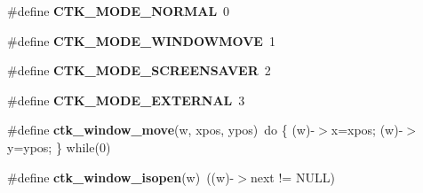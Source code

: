 \begin{DoxyCompactItemize}
\item 
\hypertarget{group__ctk_gaf19084b5b0a43593b45a2172d1390ba6}{}\#define {\bfseries C\+T\+K\+\_\+\+M\+O\+D\+E\+\_\+\+N\+O\+R\+M\+A\+L}~0\label{group__ctk_gaf19084b5b0a43593b45a2172d1390ba6}

\item 
\hypertarget{group__ctk_gaced6064f07d93129008ec8a2fcb638af}{}\#define {\bfseries C\+T\+K\+\_\+\+M\+O\+D\+E\+\_\+\+W\+I\+N\+D\+O\+W\+M\+O\+V\+E}~1\label{group__ctk_gaced6064f07d93129008ec8a2fcb638af}

\item 
\hypertarget{group__ctk_ga24ef80b235aaf2ca8cbafb6e33a7b793}{}\#define {\bfseries C\+T\+K\+\_\+\+M\+O\+D\+E\+\_\+\+S\+C\+R\+E\+E\+N\+S\+A\+V\+E\+R}~2\label{group__ctk_ga24ef80b235aaf2ca8cbafb6e33a7b793}

\item 
\hypertarget{group__ctk_gae9acd01f96a48ba232082b5156c226d7}{}\#define {\bfseries C\+T\+K\+\_\+\+M\+O\+D\+E\+\_\+\+E\+X\+T\+E\+R\+N\+A\+L}~3\label{group__ctk_gae9acd01f96a48ba232082b5156c226d7}

\item 
\hypertarget{group__ctk_ga61b968c705766384aa3aacc44cb0723a}{}\#define {\bfseries ctk\+\_\+window\+\_\+move}(w,  xpos,  ypos)~do \{ (w)-\/$>$x=xpos; (w)-\/$>$y=ypos; \} while(0)\label{group__ctk_ga61b968c705766384aa3aacc44cb0723a}

\item 
\hypertarget{group__ctk_ga3a22e3042b70fffea6278adf6e07d40a}{}\#define {\bfseries ctk\+\_\+window\+\_\+isopen}(w)~((w)-\/$>$next != N\+U\+L\+L)\label{group__ctk_ga3a22e3042b70fffea6278adf6e07d40a}

\end{DoxyCompactItemize}
